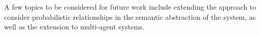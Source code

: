 \documentclass[conference]{IEEEtran}
\begin{document}
A few topics to be considered for future work include extending the approach to consider probabilistic relationships in the semantic abstraction of the system, as well as the extension to multi-agent systems.














%



\end{document}
